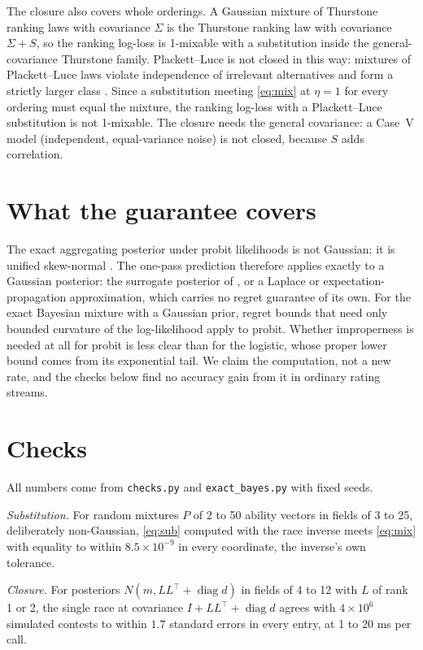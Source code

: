 \documentclass[11pt]{article}
\begin{document}
The closure also covers whole orderings. A Gaussian mixture of
Thurstone ranking laws with covariance $\Sigma$ is the Thurstone
ranking law with covariance $\Sigma+S$, so the ranking log-loss is
1-mixable with a substitution inside the general-covariance Thurstone
family. Plackett--Luce is not closed in this way: mixtures of
Plackett--Luce laws violate independence of irrelevant alternatives
\citep{train2009} and form a strictly larger class \citep{zhao2016}.
Since a substitution meeting \eqref{eq:mix} at $\eta=1$ for every
ordering must equal the mixture, the ranking log-loss with a
Plackett--Luce substitution is not 1-mixable. The closure needs the
general covariance: a Case~V model (independent, equal-variance noise)
is not closed, because $S$ adds correlation.

\section{What the guarantee covers}

The exact aggregating posterior under probit likelihoods is not
Gaussian; it is unified skew-normal \citep{durante2019}. The
one-pass prediction therefore applies exactly to a Gaussian posterior:
the surrogate posterior of \citet{jezequel2021}, or a Laplace or
expectation-propagation approximation, which carries no regret
guarantee of its own. For the exact Bayesian mixture with a Gaussian
prior, regret bounds that need only bounded curvature of the
log-likelihood \citep{kakade2005,kakade2005gp} apply to probit. Whether
improperness is needed at all for probit is less clear than for the
logistic, whose proper lower bound comes from its exponential tail.
We claim the computation, not a new rate, and the checks below find
no accuracy gain from it in ordinary rating streams.

\section{Checks}

All numbers come from \texttt{checks.py} and \texttt{exact\_bayes.py} with fixed seeds.

\emph{Substitution.} For random mixtures $P$ of 2 to 50 ability
vectors in fields of 3 to 25, deliberately non-Gaussian,
\eqref{eq:sub} computed with the race inverse meets \eqref{eq:mix} with
equality to within $8.5\times10^{-9}$ in every coordinate, the inverse's own
tolerance.

\emph{Closure.} For posteriors $N(m,LL^\top+\operatorname{diag}d)$ in
fields of 4 to 12 with $L$ of rank 1 or 2, the single race at
covariance $I+LL^\top+\operatorname{diag}d$ agrees with
$4\times10^6$ simulated contests to within $1.7$ standard errors in
every entry, at 1 to 20 ms per call.
\end{document}

